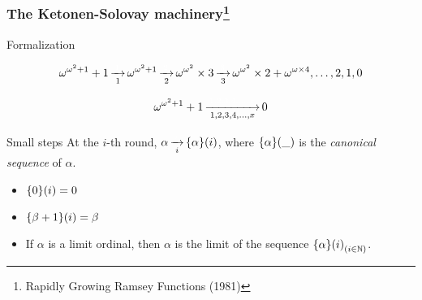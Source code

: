 \documentclass[10pt, fleqn]{beamer}
\begin{document}

\begin{frame}
  \frametitle{The Ketonen-Solovay machinery\footnote{Rapidly Growing {R}amsey Functions (1981)}}
    \begin{block}{Formalization}
      {\color{mathcolor}
      $$\omega^{\omega^2+1}+1 \rplus{1} \omega^{\omega^2+1}
      \rplus{2} \omega^{\omega^2}\times 3 
      \rplus{3} \omega^{\omega^2}\times 2 +
      \omega ^ {\omega \times 4}, \dots,2,1,0$$

      \vspace{6pt}
      
      $$ \omega^{\omega^2+1}+1 \rplus{1,2,3,4,\dots,x} 0$$}
    \end{block}
    
      \begin{block}{Small steps}
        At the $i$-th round, 
           \textcolor{mathcolor}{$\alpha \rplus{i} \canonseq{\alpha}{i}$},
           where \textcolor{mathcolor}{$\mbox{$\{\alpha\}(\_)$}$} is the \emph{canonical sequence} of \textcolor{mathcolor}{$\alpha$}.
          
             \begin{itemize}
             \item  \textcolor{mathcolor}{$\mbox{$\{0\}(i)$}=0$}
             \item \textcolor{mathcolor}{$\mbox{$\{\beta+1\}(i)$}=\beta$}
             \item If \textcolor{mathcolor}{$\alpha$} is a limit ordinal, then \textcolor{mathcolor}{$\alpha$} is the limit of the sequence
               \textcolor{mathcolor}{$\mbox{$\{\alpha\}(i)$}_{ (i\in\mathbb{N})}$}.
             \end{itemize}
           \end{block}
  
    
    
 
   
 
  \end{frame}
\end{document}
